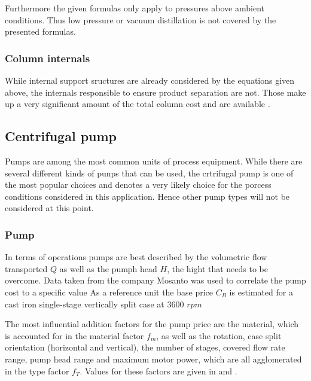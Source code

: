 			Furthermore the given formulas only apply to pressures above ambient conditions. Thus low pressure
			or vacuum distillation is not covered by the presented formulas. 
			
		\subsubsection{Column internals}
			While internal support sructures are already considered by the equations given above, the 
			internals responsible to ensure product separation are not. Those make up a very significant 
			amount of the total column cost and are available . 
	
	\subsection{Centrifugal pump}
		Pumps are among the most common units of process equipment. While there are several different 
		kinds of punps that can be used, the crtrifugal pump is one of the most popular choices and
		denotes a very likely choice for the porcess conditions considered in this application. Hence
		other pump types will not be considered at this point. 
		
		\subsubsection{Pump}
			In terms of operations pumps are best described by the volumetric flow transported $Q$ as 
			well as the pumph head $H$, the hight that needs to be overcome. Data taken from the company 
			Mosanto was used to correlate the pump cost to a specific value 
			As a reference unit the base price $C_B$ is estimated for a cast iron single-stage 
			vertically split case at 3600 $rpm$
			
			The most influential addition factors for the pump price are the material, which is accounted 
			for in the material factor $f_m$, as well as the rotation, case split orientation (horizontal
			and vertical), the number of stages, covered flow rate range, pump head range and maximum 
			motor power, which are all agglomerated in the type factor $f_T$. Values for these factors 
			are given in  and . 
			
